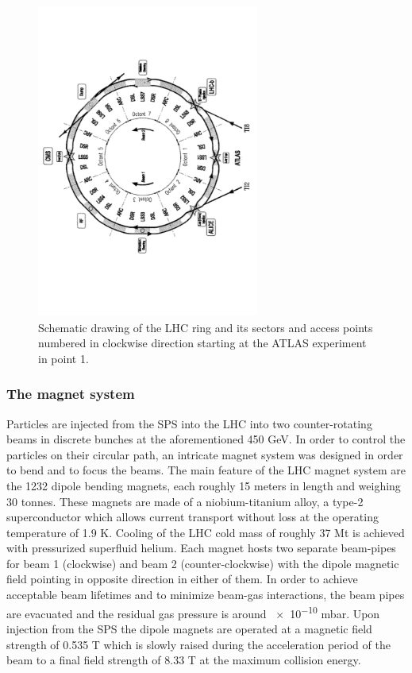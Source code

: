 \begin{figure}[h!]
    \centering
    \includegraphics[width=0.65\textwidth]{../figs/lhc_scheme.pdf}
    \caption{Schematic drawing of the LHC ring and its sectors and access points numbered in clockwise direction
    starting at the ATLAS experiment in point 1.}
    \label{fig:lhc_scheme}
\end{figure}


\subsubsection*{The magnet system}
Particles are injected from the SPS into the LHC into two counter-rotating beams in discrete bunches
at the aforementioned 450 GeV. In order to control the particles on their circular path, an intricate magnet 
system was designed in order to bend and to focus the beams. The main feature of the LHC magnet system are
the 1232 dipole bending magnets, each roughly 15 meters in length and weighing 30 tonnes. These magnets
are made of a niobium-titanium alloy, a type-2 superconductor which allows current transport without loss
at the operating temperature of 1.9 K. Cooling of the LHC cold mass of roughly 37 Mt is achieved with pressurized superfluid helium. 
Each magnet hosts two separate beam-pipes for beam 1 (clockwise) and beam
2 (counter-clockwise) with the dipole magnetic field pointing in opposite direction in either of them. In order to achieve
acceptable beam lifetimes and to minimize beam-gas interactions, the beam pipes are evacuated and the residual gas
pressure is around \num{e-10} mbar.
Upon injection from the SPS the dipole magnets are operated at a magnetic field strength of 0.535 T which is slowly
raised during the acceleration period of the beam to a final field strength of 8.33 T at the maximum collision
energy.

